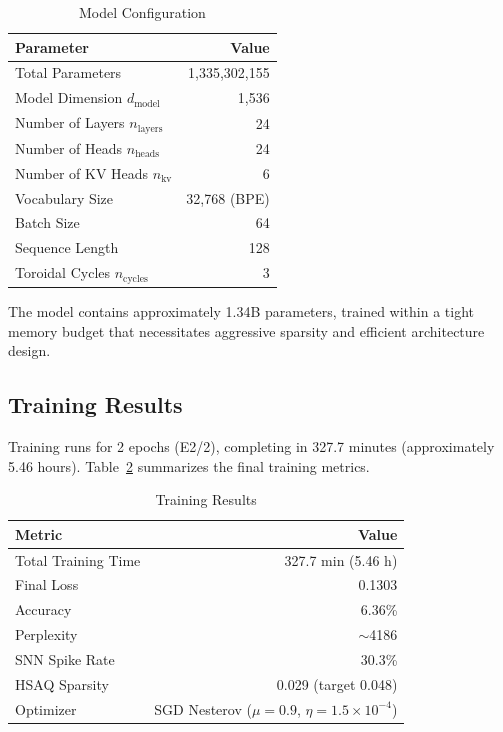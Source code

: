 \documentclass[conference]{IEEEtran}
\begin{document}
\begin{table}[h]
\centering
\caption{Model Configuration}
\label{tab:config}
\small
\begin{tabular}{lr}
\toprule
\textbf{Parameter} & \textbf{Value} \\
\midrule
Total Parameters & 1,335,302,155 \\
Model Dimension $d_{\text{model}}$ & 1,536 \\
Number of Layers $n_{\text{layers}}$ & 24 \\
Number of Heads $n_{\text{heads}}$ & 24 \\
Number of KV Heads $n_{\text{kv}}$ & 6 \\
Vocabulary Size & 32,768 (BPE) \\
Batch Size & 64 \\
Sequence Length & 128 \\
Toroidal Cycles $n_{\text{cycles}}$ & 3 \\
\bottomrule
\end{tabular}
\end{table}

The model contains approximately 1.34B parameters, trained within a tight memory budget that necessitates aggressive sparsity and efficient architecture design.

\subsection{Training Results}

Training runs for 2 epochs (E2/2), completing in 327.7 minutes (approximately 5.46 hours). Table~\ref{tab:results} summarizes the final training metrics.

\begin{table}[h]
\centering
\caption{Training Results}
\label{tab:results}
\small
\begin{tabular}{lr}
\toprule
\textbf{Metric} & \textbf{Value} \\
\midrule
Total Training Time & 327.7 min (5.46 h) \\
Final Loss & 0.1303 \\
Accuracy & 6.36\% \\
Perplexity & $\sim$4186 \\
SNN Spike Rate & 30.3\% \\
HSAQ Sparsity & 0.029 (target 0.048) \\
Optimizer & SGD Nesterov ($\mu=0.9$, $\eta=1.5\times10^{-4}$) \\
\bottomrule
\end{tabular}
\end{table}
\end{document}
